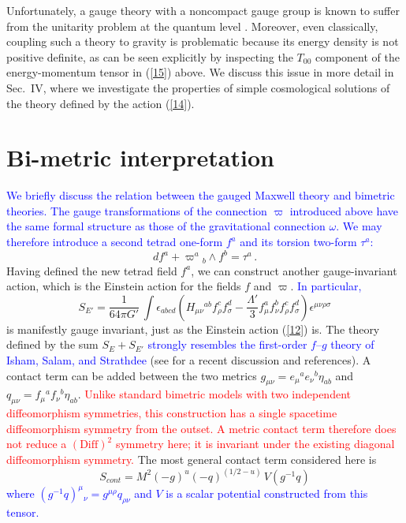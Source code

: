 \documentclass [prd,reprint,eqsecnum,nofootinbib]  {revtex4-1}
\newcommand{\lang}[1]{\textcolor{blue}{#1}}
\newcommand{\science}[1]{\textcolor{red}{#1}}
\begin{document}
Unfortunately, a gauge theory with a noncompact gauge group is
known to suffer from the unitarity problem at the quantum level
\cite{Hsu:1980zt}. Moreover, even classically, coupling such a theory to gravity is
problematic because its energy density is not
positive definite, as can be seen explicitly by inspecting the
$T_{00}$ component of the energy-momentum tensor in (\ref{15})
above. We discuss this issue in more detail in Sec.~IV, where we
investigate the properties of simple cosmological solutions of the
theory defined by the action (\ref{14}).

\section{Bi-metric interpretation}

\lang{We briefly discuss the relation between the gauged Maxwell
theory and bimetric theories. The gauge transformations of the
connection $\varpi$ introduced above have the same formal structure
as those of the gravitational connection $\omega$. We may therefore
introduce a second tetrad one-form $f^a$ and its torsion two-form
$\tau^a$:}
\begin{equation}\label{17}
    df^a + \varpi^a{}_b\wedge f^b=\tau^a\,.
\end{equation}
Having defined the new tetrad field $f^a$, we can construct another
gauge-invariant action, which is the Einstein action for the fields
$f$ and $\varpi$.
\lang{In particular,}
\begin{equation}
S_{E'} =\frac1{64\pi G'}\,
\int\epsilon_{abcd}\left(H_{\mu\nu}{}^{ab}f_{\rho}^{c}f_{\sigma}^{d}
-\frac{\Lambda'}{3}f_{\mu}^{a}f_{\nu}^{b}f_{\rho}^{ c}f_{\sigma}^{
d}\right)\epsilon^{\mu\nu\rho\sigma}\label{18}
\end{equation}
is manifestly gauge invariant, just as the Einstein action
(\ref{12}) is. The theory defined by the sum $S_E+S_{E'}$
\lang{strongly resembles the first-order $f$--$g$ theory of Isham,
Salam, and Strathdee} \cite{Isham:1971gm} (see
\cite{Banados:2008fi} for a recent discussion and references). A
contact term can be added between the two metrics
$g_{\mu\nu}=e_\mu{}^ae_\nu{}^b\eta_{ab}$ and
$q_{\mu\nu}=f_\mu{}^af_\nu{}^b\eta_{ab}$. \science{Unlike standard
bimetric models with two independent diffeomorphism symmetries, this
construction has a single spacetime diffeomorphism symmetry from the
outset. A metric contact term therefore does not reduce a
$(\mathrm{Diff})^2$ symmetry here; it is invariant under the
existing diagonal diffeomorphism symmetry.} The most general contact
term considered here is
\begin{equation}\label{19}
    S_{cont} =
   {M^2}(-g)^u(-q)^{(1/2-u)}\, V(g^{-1}q)
\end{equation}
\lang{where $(g^{-1}q)^\mu{}_\nu = g^{\mu\rho}q_{\rho\nu}$ and $V$ is
a scalar potential constructed from this tensor.}
\end{document}
